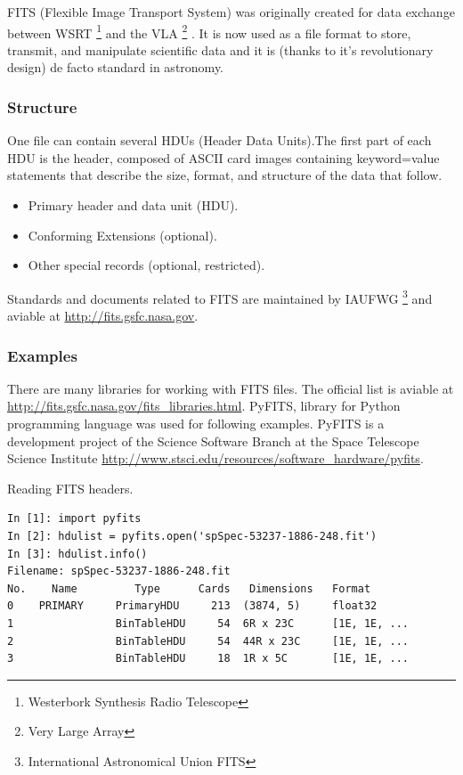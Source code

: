 \bigskip

FITS (Flexible Image Transport System) was originally created for data
exchange between WSRT \footnote{Westerbork Synthesis Radio Telescope}
and the VLA \footnote{Very Large Array} \cite{fits1997}. It is now
used as a file format to store, transmit, and manipulate scientific
data and it is (thanks to it's revolutionary design) de facto standard
in astronomy.


\subsubsection*{Structure}

One file can contain several HDUs (Header Data Units).The first part
of each HDU is the header, composed of ASCII card images containing
keyword=value statements that describe the size, format, and structure
of the data that follow.

\begin{itemize}
\item Primary header and data unit (HDU).
\item Conforming Extensions (optional).
\item Other special records (optional, restricted).
\end{itemize}


Standards and documents related to FITS are maintained by IAUFWG
\footnote{International Astronomical Union FITS} and aviable at
\url{http://fits.gsfc.nasa.gov}.

\subsubsection*{Examples}

There are many libraries for working with FITS files. The official
list is aviable at
\url{http://fits.gsfc.nasa.gov/fits_libraries.html}. PyFITS, library
for Python programming language was used for following
examples. PyFITS is a development project of the Science Software
Branch at the Space Telescope Science Institute
\url{http://www.stsci.edu/resources/software_hardware/pyfits}.


Reading FITS headers.

\begin{lstlisting}
In [1]: import pyfits
In [2]: hdulist = pyfits.open('spSpec-53237-1886-248.fit')
In [3]: hdulist.info()
Filename: spSpec-53237-1886-248.fit
No.    Name         Type      Cards   Dimensions   Format
0    PRIMARY     PrimaryHDU     213  (3874, 5)     float32
1                BinTableHDU     54  6R x 23C      [1E, 1E, ...
2                BinTableHDU     54  44R x 23C     [1E, 1E, ...
3                BinTableHDU     18  1R x 5C       [1E, 1E, ...
\end{lstlisting}

